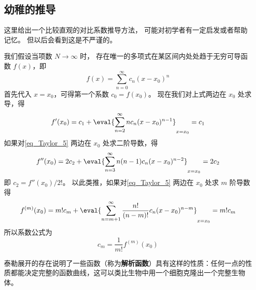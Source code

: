 \subsection{幼稚的推导}
这里给出一个比较直观的对比系数推导方法， 可能对初学者有一定启发或者帮助记忆。 但以后会看到这是不严谨的。

我们假设当项数 $N \to \infty$ 时， 存在唯一的多项式在某区间内处处趋于无穷可导函数 $f(x)$，即
\begin{equation}\label{eq_Taylor_5}
f(x) = \sum_{n = 0}^\infty  c_n (x - x_0)^n
\end{equation}
首先代入 $x = x_0$，可得第一个系数 $c_0 = f(x_0)$。 现在我们对上式两边在 $x_0$ 处求导，得
\begin{equation}
f'(x_0) = c_1 + \eval{ \sum_{n = 2}^\infty n c_n (x - x_0)^{n - 1} }_{x = x_0}  = c_1
\end{equation}
如果对\autoref{eq_Taylor_5} 两边在 $x_0$ 处求二阶导数，得
\begin{equation}
f''(x_0) = 2 c_2 + \eval{ \sum_{n = 3}^\infty  n(n - 1) c_n (x - x_0)^{n - 2} }_{x = x_0}  = 2 c_2
\end{equation}
即 $c_2 = f''(x_0)/2!$。  以此类推，如果对\autoref{eq_Taylor_5} 两边在 $x_0$ 处求 $m$ 阶导数得
\begin{equation}
f^{(m)}(x_0) = m! c_m + \eval{ \sum_{n = m + 1}^\infty  \frac{n!}{(n - m)!} c_n (x - x_0)^{n - m} }_{x = x_0}  = m! c_m
\end{equation}
所以系数公式为
\begin{equation}
{c_m} = \frac{1}{m!} f^{(m)}(x_0)
\end{equation}

泰勒展开的存在说明了一些函数（称为\textbf{解析函数}）具有这样的性质：任何一点的性质都能决定完整的函数曲线，这可以类比生物中用一个细胞克隆出一个完整生物体。
